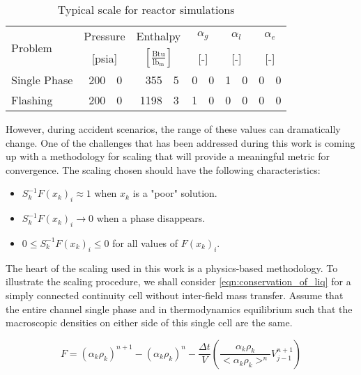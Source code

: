 \begin{table}[ht]
\centering
\begin{tabular}{@{}lr@{.}lr@{.}lr@{.}lr@{.}lr@{.}l@{}} \toprule
\multirow{2}{*}{Problem} & \multicolumn{2}{c}{Pressure} & \multicolumn{2}{c}{Enthalpy}             & \multicolumn{2}{c}{$\alpha_g$} & \multicolumn{2}{c}{$\alpha_l$} & \multicolumn{2}{c}{$\alpha_e$} \\ 
                         & \multicolumn{2}{c}{[psia]} & \multicolumn{2}{c}{$[\frac{\text{Btu}}{\text{lb}_{\text{m}}}]$} & \multicolumn{2}{c}{[-]}      & \multicolumn{2}{c}{[-]}      & \multicolumn{2}{c}{[-]}      \\ \midrule
Single Phase             &  200&0                       &  355&5                                   & 0&0                            & 1&0                            & 0&0 \\
Flashing                 &  200&0                       & 1198&3                                   & 1&0                            & 0&0                            & 0&0 \\ \bottomrule  
\end{tabular}
\caption{Typical scale for reactor simulations}
\label{tab:scaling_units_scales}
\end{table}

However, during accident scenarios, the range of these values can dramatically change.
One of the challenges that has been addressed during this work is coming up with a methodology for scaling that will provide a meaningful metric for convergence.
The scaling chosen should have the following characteristics:
\begin{itemize}
\item{$S^{-1}_k F(x_k)_i \approx 1$ when $x_k$ is a "poor" solution.}
\item{$S^{-1}_k F(x_k)_i \rightarrow 0$ when a phase disappears.}
\item{$0 \leq S^{-1}_k F(x_k)_i \leq 0 $ for all values of $F(x_k)_i$.}
\end{itemize}

The heart of the scaling used in this work is a physics-based methodology.
To illustrate the scaling procedure, we shall consider \eqref{eqn:conservation_of_liq} for a simply connected continuity cell without inter-field mass transfer.
Assume that the entire channel single phase and in thermodynamics equilibrium such that the macroscopic densities on either side of this single cell are the same.

\begin{equation}
F = \left(\alpha_k \rho_k\right)^{n+1} - \left( \alpha_k \rho_k \right)^n - \frac{\Delta t}{V} \left( \frac{\alpha_k \rho_k }{<\alpha_k \rho_k>^n} V^{n+1}_{j-1} \right)
\end{equation}

